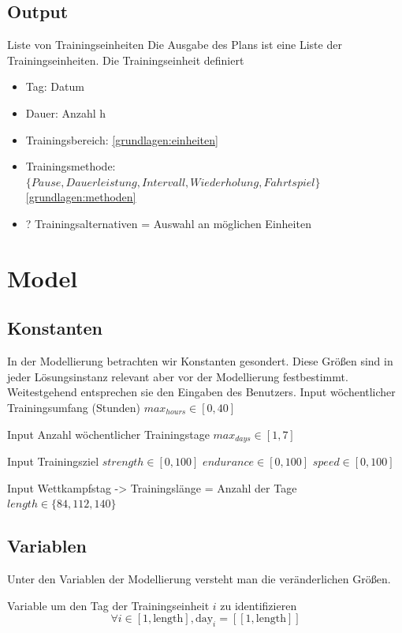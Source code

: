 \subsection{Output}
Liste von Trainingseinheiten
\label{sec:modellierung:output}
Die Ausgabe des Plans ist eine Liste der Trainingseinheiten. Die Trainingseinheit definiert 
    \begin{itemize}
        \item Tag: Datum
        \item Dauer: Anzahl h
        \item Trainingsbereich: \ref{grundlagen:einheiten}
        \item Trainingsmethode: $\{Pause, Dauerleistung, Intervall, Wiederholung, Fahrtspiel\}$ \ref{grundlagen:methoden}
        \item ? Trainingsalternativen = Auswahl an möglichen Einheiten
    \end{itemize}
    
\section{Model}
\subsection{Konstanten}
In der Modellierung betrachten wir Konstanten gesondert. Diese Größen sind in jeder Lösungsinstanz relevant aber vor der Modellierung festbestimmt. Weitestgehend entsprechen sie den Eingaben des Benutzers.
Input wöchentlicher Trainingsumfang (Stunden)
$max_{hours} \in [0, 40]$

Input Anzahl wöchentlicher Trainingstage
$max_{days} \in [1, 7]$

Input Trainingsziel
$strength \in [0, 100]$
$endurance \in [0, 100]$        
$speed \in [0, 100]$
        
Input Wettkampfstag -> Trainingslänge = Anzahl der Tage
$length \in \{ 84, 112, 140\} $ 
        
\subsection{Variablen}
Unter den Variablen der Modellierung versteht man die veränderlichen Größen.

        
        Variable um den Tag der Trainingseinheit $i$ zu identifizieren
        \begin{equation}
            \forall i \in [1, \text{length}], \text{day}_i = [\![1, \text{length}]\!]
        \end{equation}
    
